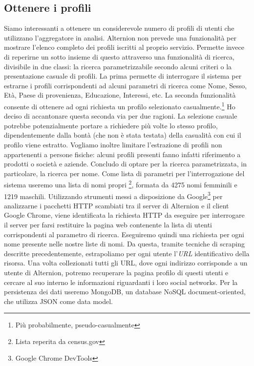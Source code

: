 \subsection{Ottenere i profili}
Siamo interessanti a ottenere un considerevole numero di profili di utenti che utilizzano l'aggregatore in analisi. Alternion non prevede una funzionalità per mostrare l'elenco completo dei profili iscritti al proprio servizio. Permette invece di reperirne un sotto insieme di questo attraverso una funzionalità di ricerca, divisibile in due classi: la ricerca parametrizzabile secondo alcuni criteri o la presentazione casuale di profili. La prima permette di interrogare il sistema per estrarne i profili corrispondenti ad alcuni parametri di ricerca come Nome, Sesso, Età, Paese di provenienza, Educazione, Interessi, etc. La seconda funzionalità consente di ottenere ad ogni richiesta un profilo selezionato casualmente.\footnote{Più probabilmente, pseudo-casualmente} Ho deciso di accantonare questa seconda via per due ragioni. La selezione casuale potrebbe potenzialmente portare a richiedere più volte lo stesso profilo, dipendentemente dalla bontà (che non è stata testata) della casualità con cui il profilo viene estratto. Vogliamo inoltre limitare l'estrazione di profili non appartenenti a persone fisiche: alcuni profili presenti fanno infatti riferimento a prodotti o società e aziende. Concludo di optare per la ricerca parametrizzata, in particolare, la ricerca per nome. Come lista di parametri per l'interrogazione del sistema useremo una lista di nomi propri \footnote{Lista reperita da census.gov}, formata da 4275 nomi femminili e 1219 maschili. Utilizzando strumenti messi a disposizione da Google\footnote{Google Chrome DevTools} per analizzarne i pacchetti HTTP scambiati tra il server di Alternion e il client Google Chrome, viene identificata la richiesta HTTP da eseguire per interrogare il server per farsi restituire la pagina web contenente la lista di utenti corrispondenti al parametro di ricerca. Eseguiremo quindi una richiesta per ogni nome presente nelle nostre liste di nomi. Da questa, tramite tecniche di scraping descritte precedentemente, estrapoliamo per ogni utente l'\textit{URL} identificativo della risorsa. Una volta collezionati tutti gli URL, dove ogni indirizzo corrisponde a un utente di Alternion, potremo recuperare la pagina profilo di questi utenti e cercare al suo interno le informazioni riguardanti i loro social networks. Per la persistenza dei dati useremo MongoDB, un database NoSQL document-oriented, che utilizza JSON come data model.
